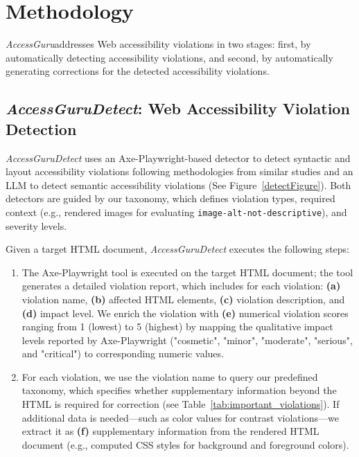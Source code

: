 \documentclass[sigconf, nonacm]{acmart}
\newcommand{\method}{\emph{AccessGuru}}
\begin{document}
\section{Methodology}
\method \space addresses Web accessibility violations in two stages: first, by automatically detecting accessibility violations, and second, by automatically generating corrections for the detected accessibility violations. 
\subsection{\method \emph{Detect}: Web Accessibility Violation Detection} \label{detect}

\method \emph{Detect} uses an Axe-Playwright-based detector to detect syntactic and layout accessibility violations following methodologies from similar studies \cite{DBLP:journals/corr/abs-2401-16450,acosta2020dataset} and an LLM to detect semantic accessibility violations (See Figure~\ref{detectFigure}). Both detectors are guided by our taxonomy, which defines violation types, required context (e.g., rendered images for evaluating \texttt{image-alt-not-descriptive}), and severity levels.

Given a target HTML document, \method \emph{Detect} executes the following steps:
\begin{enumerate}   
    \item The Axe-Playwright tool is executed on the target HTML document; the tool generates a detailed violation report, which includes for each violation: \textbf{(a)} violation name, \textbf{(b)} affected HTML elements, \textbf{(c)} violation description,  and \textbf{(d)} impact level. We enrich the violation with \textbf{(e)} numerical violation scores ranging from 1 (lowest) to 5 (highest) by mapping the qualitative impact levels reported by Axe-Playwright ("cosmetic", "minor", "moderate", "serious", and "critical") to corresponding numeric values.

    \item For each violation, we use the violation name to query our predefined taxonomy, which specifies whether supplementary information beyond the HTML is required for correction (see Table~\ref{tab:important_violations}). If additional data is needed—such as color values for contrast violations—we extract it as \textbf{(f)} supplementary information from the rendered HTML document (e.g., computed CSS styles for background and foreground colors). 
\end{enumerate}
\end{document}
